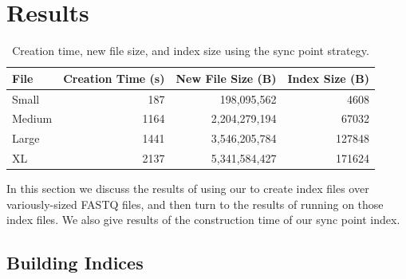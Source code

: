 \section{Results}
\label{sec:results}

\begin{table}[ht]
    \centering
    \caption{Creation time, new file size, and index size using the sync point
    strategy.}
\begin{tabular}{l|r|r|r}
   
    File & Creation Time (s) & New File Size (B) & Index Size (B)\\
    \hline
    Small & 187 & 198,095,562 &  4608\\
    Medium & 1164 & 2,204,279,194 &  67032\\
    Large & 1441 &  3,546,205,784 &127848\\
    XL & 2137 & 5,341,584,427 & 171624\\
\end{tabular}
    \label{tab:sync}
\end{table}


In this section we discuss the results of using our \ibuilder to create index
files over variously-sized \gzip FASTQ files, and then turn to the results of
running \ireader on those index files. We also give results of the construction
time of our sync point index.

\subsection{Building Indices}
\label{sec:buildresults}

